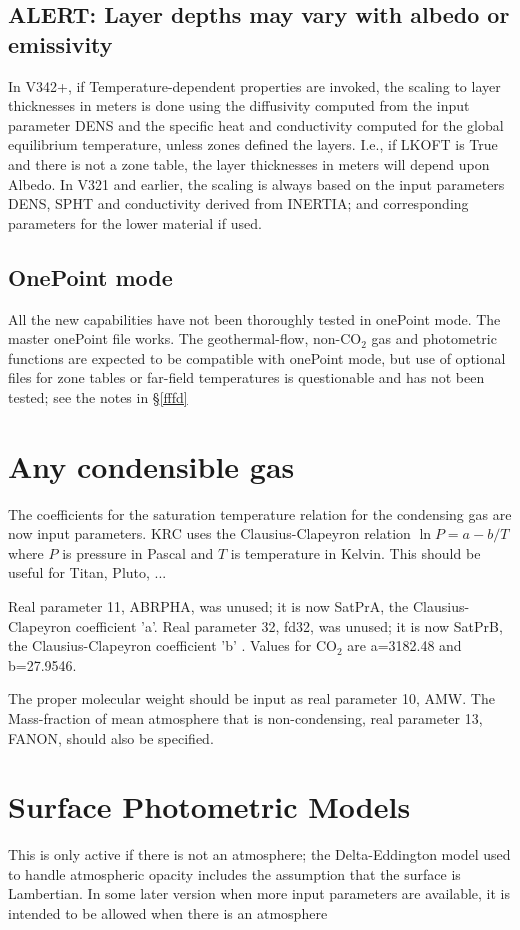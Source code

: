 \documentclass{article}
\begin{document}
\subsection{ALERT: Layer depths may vary with albedo or emissivity}

In V342+, if Temperature-dependent properties are invoked, the scaling to layer
thicknesses in meters is done using the diffusivity computed from the input
parameter DENS and the specific heat and conductivity computed for the global
equilibrium temperature, unless zones defined the layers.  I.e., if LKOFT is
True and there is not a zone table, the layer thicknesses in meters will depend
upon Albedo. In V321 and earlier, the scaling is always based on the input
parameters DENS, SPHT and conductivity derived from INERTIA; and corresponding
parameters for the lower material if used.

\subsection{OnePoint mode}
All the new capabilities have not been thoroughly tested in onePoint mode. The
master onePoint file  works. The geothermal-flow, non-CO$_2$ gas
and photometric functions are expected to be compatible with onePoint mode, but
use of optional files for zone tables or far-field temperatures is questionable
and has not been tested; see the notes in \S \ref{fffd}

\section{Any condensible gas \label{gas}}

The coefficients for the saturation temperature relation for the condensing gas
are now input parameters. KRC uses the Clausius-Clapeyron relation $\ln P = a -
b/T$ where $P$ is pressure in Pascal and $T$ is temperature in Kelvin. This
should be useful for Titan, Pluto, ...

Real parameter 11, ABRPHA, was unused; it is now SatPrA, the Clausius-Clapeyron
coefficient 'a'. Real parameter 32, fd32, was unused; it is now SatPrB, the
Clausius-Clapeyron coefficient 'b' .  Values for CO$_2$ are a=3182.48 and
b=27.9546.

The proper molecular weight should be input as real parameter 10, AMW. The
Mass-fraction of mean atmosphere that is non-condensing, real parameter 13,
FANON, should also be specified.

\section{Surface Photometric Models \label{pm} }
This is only active if there is not an atmosphere; the Delta-Eddington model
used to handle atmospheric opacity includes the assumption that the surface is
Lambertian. In some later version when more input parameters are available, it
is intended to be allowed when there is an atmosphere
\end{document}
